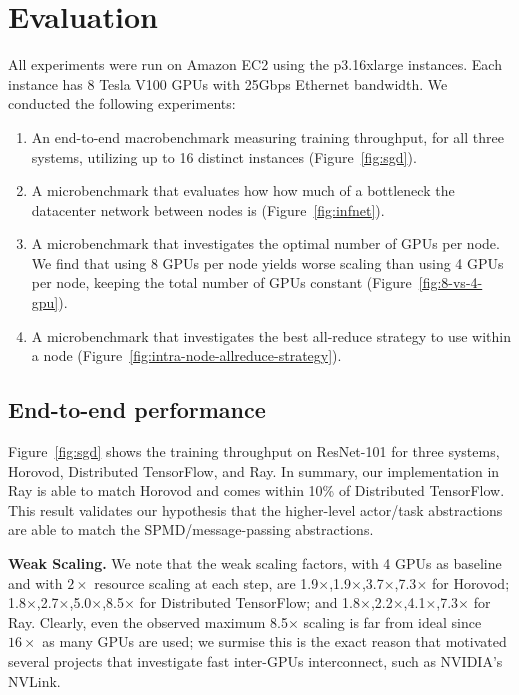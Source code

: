 \section{Evaluation}
All experiments were run on Amazon EC2 using the p3.16xlarge instances.  Each instance has 8 Tesla V100 GPUs with 25Gbps Ethernet bandwidth. We conducted the following experiments:

\begin{enumerate}
    \item An end-to-end macrobenchmark measuring training throughput, for all three systems, utilizing up to 16 distinct instances (Figure~\ref{fig:sgd}).
    \item A microbenchmark that evaluates how how much of a bottleneck the datacenter network between nodes is (Figure~\ref{fig:infnet}).
    \item A microbenchmark that investigates the optimal number of GPUs per node. We find that using 8 GPUs per node yields worse scaling than using 4 GPUs per node, keeping the total number of GPUs constant (Figure~\ref{fig:8-vs-4-gpu}).
    \item A microbenchmark that investigates the best all-reduce strategy to use within a node (Figure~\ref{fig:intra-node-allreduce-strategy}).
\end{enumerate}


\subsection{End-to-end performance}
Figure~\ref{fig:sgd} shows the training throughput on ResNet-101 for three systems, Horovod, Distributed TensorFlow, and Ray.  In summary, our implementation in Ray is able to match Horovod and comes within 10\% of Distributed TensorFlow.  This result validates our hypothesis that the higher-level actor/task abstractions are able to match the SPMD/message-passing abstractions.

{\bf Weak Scaling.}  We note that the weak scaling factors, with 4 GPUs as baseline and with $2\times$ resource scaling at each step, are 1.9$\times$,1.9$\times$,3.7$\times$,7.3$\times$ for Horovod;
1.8$\times$,2.7$\times$,5.0$\times$,8.5$\times$ for Distributed TensorFlow;
and
1.8$\times$,2.2$\times$,4.1$\times$,7.3$\times$ for Ray.  Clearly, even the observed maximum 8.5$\times$ scaling  is far from ideal since $16\times$ as many GPUs are used; we surmise this is the exact reason that motivated several projects that investigate fast inter-GPUs interconnect, such as  NVIDIA's NVLink.

